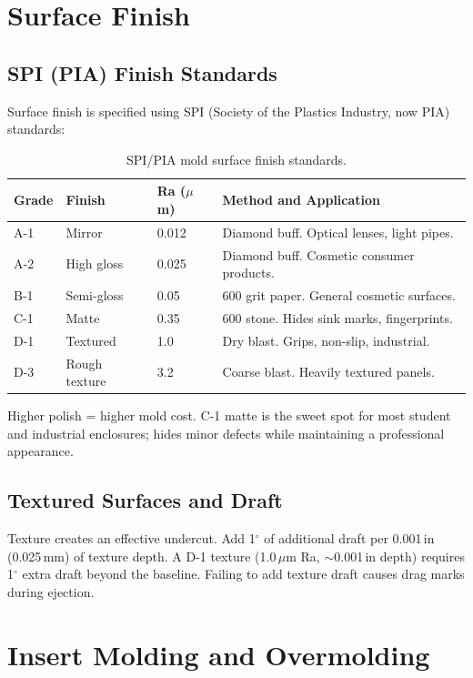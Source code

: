 \documentclass[11pt,letterpaper,twoside,openany]{book}
\providecommand{\ang}[1]{#1\ensuremath{{}^{\circ}}}
\begin{document}
\section{Surface Finish}
\subsection{SPI (PIA) Finish Standards}
Surface finish is specified using SPI (Society of the Plastics Industry, now PIA) standards:

\begin{table}[htbp]\centering\small
\begin{tabularx}{\textwidth}{l l l X}
\toprule
\textbf{Grade} & \textbf{Finish} & \textbf{Ra ($\mu$m)} & \textbf{Method and Application} \\
\midrule
A-1 & Mirror & 0.012 & Diamond buff. Optical lenses, light pipes. \\
A-2 & High gloss & 0.025 & Diamond buff. Cosmetic consumer products. \\
B-1 & Semi-gloss & 0.05 & 600 grit paper. General cosmetic surfaces. \\
C-1 & Matte & 0.35 & 600 stone. Hides sink marks, fingerprints. \\
D-1 & Textured & 1.0 & Dry blast. Grips, non-slip, industrial. \\
D-3 & Rough texture & 3.2 & Coarse blast. Heavily textured panels. \\
\bottomrule
\end{tabularx}
\caption{SPI/PIA mold surface finish standards.}
\end{table}

Higher polish = higher mold cost. C-1 matte is the sweet spot for most student and industrial enclosures; hides minor defects while maintaining a professional appearance.

\subsection{Textured Surfaces and Draft}
Texture creates an effective undercut. Add \ang{1} of additional draft per 0.001\,in (0.025\,mm) of texture depth. A D-1 texture (1.0\,$\mu$m Ra, $\sim$0.001\,in depth) requires \ang{1} extra draft beyond the baseline. Failing to add texture draft causes drag marks during ejection.

\section{Insert Molding and Overmolding}
\end{document}
